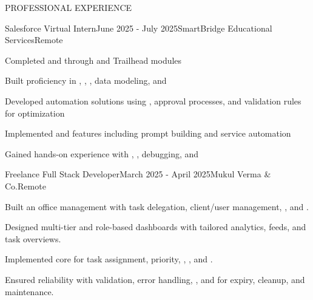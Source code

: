 \documentclass{resume}
\begin{document}
\begin{rSection}{PROFESSIONAL EXPERIENCE}

\begin{rExperience}{Salesforce Virtual Intern}{June 2025 - July 2025}{SmartBridge Educational Services}{Remote}
\item Completed  and  through  and Trailhead modules
\item Built proficiency in , , , data modeling, and 
\item Developed automation solutions using , approval processes, and validation rules for optimization
\item Implemented  and  features including prompt building and service automation
\item Gained hands-on experience with , , debugging, and 
\end{rExperience}

\begin{rExperience}{Freelance Full Stack Developer}{March 2025 - April 2025}{Mukul Verma \& Co.}{Remote}
\item Built an office management  with task delegation, client/user management, , and .
\item Designed multi-tier  and role-based dashboards with tailored analytics, feeds, and task overviews.
\item Implemented core  for task assignment, priority, , , and .
\item Ensured reliability with validation, error handling, , and  for expiry, cleanup, and maintenance.
\end{rExperience}

\end{rSection}
\end{document}
